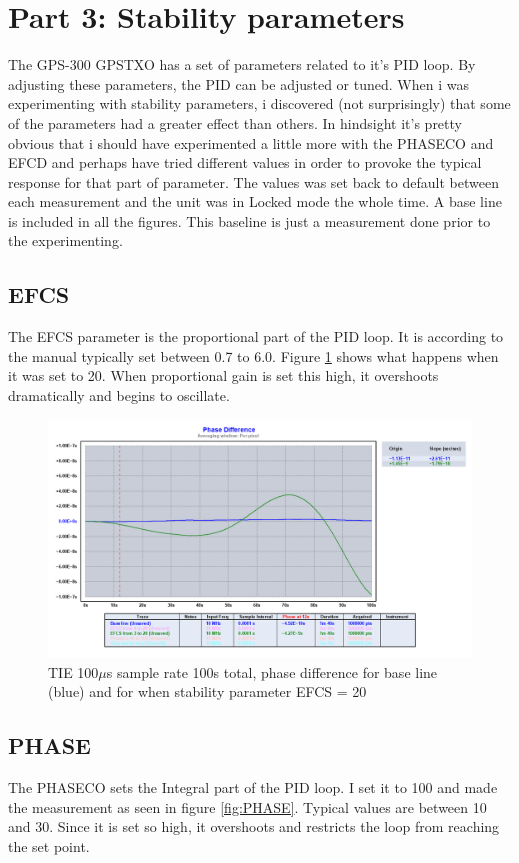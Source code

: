 \documentclass[11pt,english,a4paper]{article}
\begin{document}
\section{Part 3: Stability parameters}
The GPS-300 GPSTXO has a set of parameters related to it's PID loop. By adjusting these parameters, the PID can be adjusted or tuned. When i was experimenting with stability parameters, i discovered (not surprisingly) that some of the parameters had a greater effect than others. In hindsight it's pretty obvious that i should have experimented a little more with the PHASECO and EFCD and perhaps have tried different values in order to provoke the typical response for that part of parameter. The values was set back to default between each measurement and the unit was in Locked mode the whole time. A base line is included in all the figures. This baseline is just a measurement done prior to the experimenting.

\subsection{EFCS}
The EFCS parameter is the proportional part of the PID loop. It is according to the manual typically set between 0.7 to 6.0. Figure \ref{fig:EFCS} shows what happens when it was set to 20. When proportional gain is set this high, it overshoots dramatically and begins to oscillate.

\begin{figure}[!htb]
  \centering
    \includegraphics[width=1\textwidth]{EFCS.png}
      \caption{TIE 100$\mu$s sample rate 100s total, phase difference for base line (blue) and for when stability parameter EFCS = 20}
          \label{fig:EFCS}
\end{figure}

\subsection{PHASE}
The PHASECO sets the Integral part of the PID loop. I set it to 100 and made the measurement as seen in figure \ref{fig:PHASE}. Typical values are between 10 and 30. Since it is set so high, it overshoots and restricts the loop from reaching the set point. 
\end{document}
